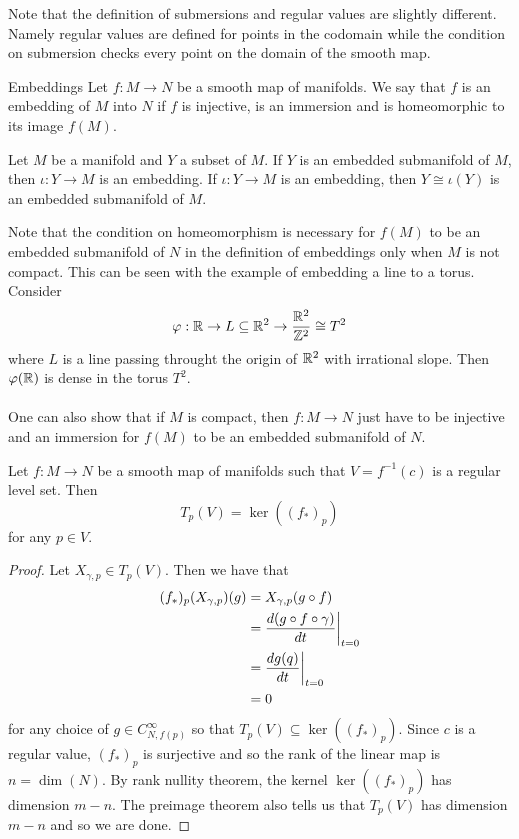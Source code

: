 \documentclass[a4paper]{article}
\begin{document}
Note that the definition of submersions and regular values are slightly different. Namely regular values are defined for points in the codomain while the condition on submersion checks every point on the domain of the smooth map. 

\begin{defn}{Embeddings}{} Let $f:M\to N$ be a smooth map of manifolds. We say that $f$ is an embedding of $M$ into $N$ if $f$ is injective, is an immersion and is homeomorphic to its image $f(M)$. 
\end{defn}

\begin{thm}{}{} Let $M$ be a manifold and $Y$ a subset of $M$. If $Y$ is an embedded submanifold of $M$, then $\iota:Y\to M$ is an embedding. If $\iota:Y\to M$ is an embedding, then $Y\cong\iota(Y)$ is an embedded submanifold of $M$. 
\end{thm}

Note that the condition on homeomorphism is necessary for $f(M)$ to be an embedded submanifold of $N$ in the definition of embeddings only when $M$ is not compact. This can be seen with the example of embedding a line to a torus. Consider $$\varphi:\mathbb{R}\to L\subseteq\mathbb{R}^2\to\frac{\mathbb{R}^2}{\mathbb{Z}^2}\cong T^2$$ where $L$ is a line passing throught the origin of $\mathbb{R}^2$ with irrational slope. Then $\varphi(\mathbb{R})$ is dense in the torus $T^2$. \\~\\

One can also show that if $M$ is compact, then $f:M\to N$ just have to be injective and an immersion for $f(M)$ to be an embedded submanifold of $N$. 

\begin{prp}{}{} Let $f:M\to N$ be a smooth map of manifolds such that $V=f^{-1}(c)$ is a regular level set. Then $$T_p(V)=\ker((f_\ast)_p)$$ for any $p\in V$. \tcbline
\begin{proof}
Let $X_{\gamma,p}\in T_p(V)$. Then we have that 
\begin{align*}
(f_\ast)_p(X_{\gamma,p})(g)&=X_{\gamma,p}(g\circ f)\\
&=\frac{d(g\circ f\circ\gamma)}{dt}\bigg{|}_{t=0}\\
&=\frac{dg(q)}{dt}\bigg{|}_{t=0}\\
&=0
\end{align*}
for any choice of $g\in C_{N,f(p)}^\infty$ so that $T_p(V)\subseteq\ker((f_\ast)_p)$. Since $c$ is a regular value, $(f_\ast)_p$ is surjective and so the rank of the linear map is $n=\dim(N)$. By rank nullity theorem, the kernel $\ker((f_\ast)_p)$ has dimension $m-n$. The preimage theorem also tells us that $T_p(V)$ has dimension $m-n$ and so we are done. 
\end{proof}
\end{prp}
\end{document}

